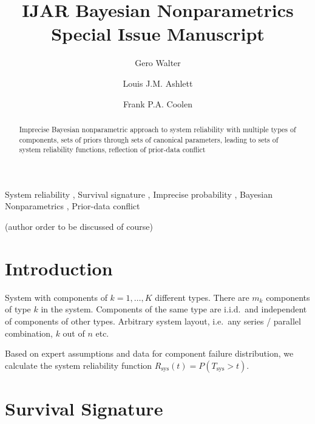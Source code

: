 \documentclass[authoryear, 12pt, a4paper]{elsarticle}
\newcommand{\Rsys}{R_\text{sys}}
\def\Tsys{T_\text{sys}}
\begin{document}

\begin{frontmatter}
\title{IJAR Bayesian Nonparametrics Special Issue Manuscript}

\author[ein]{Gero Walter}
\author[oxf]{Louis J.M. Ashlett}
\author[dur]{Frank P.A. Coolen}

\address[ein]{School of Industrial Engineering, Eindhoven University of Technology, Eindhoven, NL}
\address[oxf]{Department of Statistics, University of Oxford, Oxford, UK}
\address[dur]{Department of Mathematical Sciences, Durham University, Durham, UK}

\begin{abstract}
Imprecise Bayesian nonparametric approach to system reliability with multiple types of components,
sets of priors through sets of canonical parameters,
leading to sets of system reliability functions,
reflection of prior-data conflict
\end{abstract}

\begin{keyword}
System reliability \sep
Survival signature \sep
Imprecise probability \sep
Bayesian Nonparametrics \sep
Prior-data conflict
\end{keyword}
\end{frontmatter}



(author order to be discussed of course)

\section{Introduction}

System with components of $k=1,\ldots,K$ different types.
There are $m_k$ components of type $k$ in the system.
Components of the same type are i.i.d.\ and independent of components of other types.
Arbitrary system layout, i.e.\ any series / parallel combination, $k$ out of $n$ etc.

Based on expert assumptions and data for component failure distribution,
we calculate the system reliability function $\Rsys(t) = P(\Tsys > t)$.

\section{Survival Signature}
\end{document}
